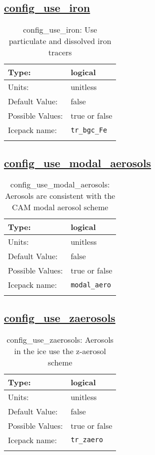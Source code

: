\subsection[config\_use\_iron]{\hyperref[sec:nm_tab_biogeochemistry]{config\_use\_iron}}
\label{subsec:nm_sec_config_use_iron}
\begin{center}
\begin{longtable}{| p{2.0in} || p{4.0in} |}
    \hline
    Type: & logical \\
    \hline
    Units: & \si{unitless} \\
    \hline
    Default Value: & false \\
    \hline
    Possible Values: & true or false \\
    \hline
    Icepack name: & \verb+tr_bgc_Fe+ \\
    \hline
    \caption{config\_use\_iron: Use particulate and dissolved iron tracers}
\end{longtable}
\end{center}
\subsection[config\_use\_modal\_aerosols]{\hyperref[sec:nm_tab_biogeochemistry]{config\_use\_modal\_aerosols}}
\label{subsec:nm_sec_config_use_modal_aerosols}
\begin{center}
\begin{longtable}{| p{2.0in} || p{4.0in} |}
    \hline
    Type: & logical \\
    \hline
    Units: & \si{unitless} \\
    \hline
    Default Value: & false \\
    \hline
    Possible Values: & true or false \\
    \hline
    Icepack name: & \verb+modal_aero+ \\
    \hline
    \caption{config\_use\_modal\_aerosols: Aerosols are consistent with the CAM modal aerosol scheme}
\end{longtable}
\end{center}
\subsection[config\_use\_zaerosols]{\hyperref[sec:nm_tab_biogeochemistry]{config\_use\_zaerosols}}
\label{subsec:nm_sec_config_use_zaerosols}
\begin{center}
\begin{longtable}{| p{2.0in} || p{4.0in} |}
    \hline
    Type: & logical \\
    \hline
    Units: & \si{unitless} \\
    \hline
    Default Value: & false \\
    \hline
    Possible Values: & true or false \\
    \hline
    Icepack name: & \verb+tr_zaero+ \\
    \hline
    \caption{config\_use\_zaerosols: Aerosols in the ice use the z-aerosol scheme}
\end{longtable}
\end{center}
